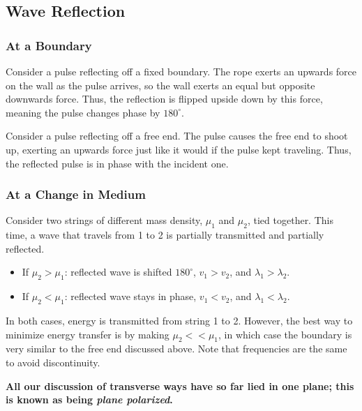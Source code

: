 \documentclass[../PhysicsFormulae.tex]{subfiles}
\begin{document}
\subsection{Wave Reflection}
\subsubsection{At a Boundary}
Consider a pulse reflecting off a fixed boundary. The rope exerts an upwards force on the wall as the pulse arrives, so the wall exerts an equal but opposite downwards force. Thus, the reflection is flipped upside down by this force, meaning the pulse changes phase by $180^{\circ}$.\bigskip

Consider a pulse reflecting off a free end. The pulse causes the free end to shoot up, exerting an upwards force just like it would if the pulse kept traveling. Thus, the reflected pulse is in phase with the incident one. 

\subsubsection{At a Change in Medium}
Consider two strings of different mass density, $\mu_1$ and $\mu_2$, tied together. This time, a wave that travels from 1 to 2 is partially transmitted and partially reflected. 
\begin{itemize}
    \item If $\mu_2 > \mu_1$: reflected wave is shifted $180^{\circ}$, $v_1 > v_2$, and $\lambda_1 > \lambda_2$.
    \item If $\mu_2 < \mu_1$: reflected wave stays in phase, $v_1 < v_2$, and $\lambda_1 < \lambda_2$. 
\end{itemize}
In both cases, energy is transmitted from string 1 to 2. However, the best way to minimize energy transfer is by making $\mu_2 << \mu_1$, in which case the boundary is very similar to the free end discussed above. Note that frequencies are the same to avoid discontinuity.

\textbf{All our discussion of transverse ways have so far lied in one plane; this is known as being \textit{plane polarized}.}
\end{document}
